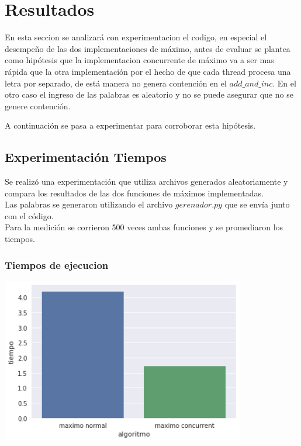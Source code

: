 \section{Resultados}

En esta seccion se analizará con experimentacion el codigo, en especial el desempe\~no de las dos implementaciones de máximo, antes de evaluar se plantea como hipótesis que la implementacion concurrente de máximo va a ser mas rápida que la otra implementación por el hecho de que cada thread procesa una letra por separado, de está manera no genera contención en el $add\_and\_inc$. En el otro caso el ingreso de las palabras es aleatorio y no se puede asegurar que no se genere contención.

A continuación se pasa a experimentar para corroborar esta hipótesis.

\subsection{Experimentación Tiempos}
Se realizó una experimentación que utiliza archivos generados aleatoriamente y compara los resultados de las dos funciones de máximos implementadas.\\

Las palabras se generaron utilizando el archivo $gerenador.py$ que se envía junto con el código.\\

Para la medición se corrieron 500 veces ambas funciones y se promediaron los tiempos.

\subsubsection{Tiempos de ejecucion} %

\begin{center}
\includegraphics[width=0.8\textwidth]{imagenes/maxvsmax.png}
\end{center}


